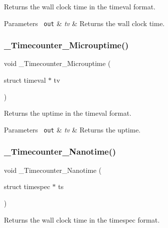 Returns the wall clock time in the timeval format. 


\begin{DoxyParams}[1]{Parameters}
\mbox{\texttt{ out}}  & {\em tv} & Returns the wall clock time. \\
\hline
\end{DoxyParams}
\mbox{\label{group__RTEMSScoreTimecounter_ga36ddf99626410dfbd01f68db09070df5}} 
\subsubsection{\texorpdfstring{\_Timecounter\_Microuptime()}{\_Timecounter\_Microuptime()}}
{\footnotesize\ttfamily void \+\_\+\+Timecounter\+\_\+\+Microuptime (\begin{DoxyParamCaption}\item[{struct timeval $\ast$}]{tv }\end{DoxyParamCaption})}



Returns the uptime in the timeval format. 


\begin{DoxyParams}[1]{Parameters}
\mbox{\texttt{ out}}  & {\em tv} & Returns the uptime. \\
\hline
\end{DoxyParams}
\mbox{\label{group__RTEMSScoreTimecounter_ga27875b3222b3884499771611d7902380}} 
\subsubsection{\texorpdfstring{\_Timecounter\_Nanotime()}{\_Timecounter\_Nanotime()}}
{\footnotesize\ttfamily void \+\_\+\+Timecounter\+\_\+\+Nanotime (\begin{DoxyParamCaption}\item[{struct timespec $\ast$}]{ts }\end{DoxyParamCaption})}



Returns the wall clock time in the timespec format. 


